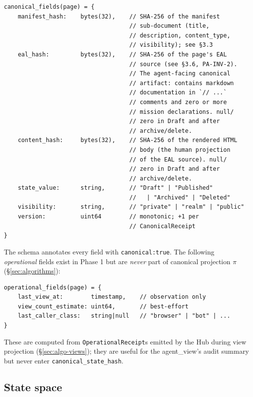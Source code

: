 \documentclass[11pt,a4paper]{article}
\theoremstyle{definition}
\begin{document}
\begin{lstlisting}
canonical_fields(page) = {
    manifest_hash:    bytes(32),    // SHA-256 of the manifest
                                    // sub-document (title,
                                    // description, content_type,
                                    // visibility); see §3.3
    eal_hash:         bytes(32),    // SHA-256 of the page's EAL
                                    // source (see §3.6, PA-INV-2).
                                    // The agent-facing canonical
                                    // artifact: contains markdown
                                    // documentation in `// ...`
                                    // comments and zero or more
                                    // mission declarations. null/
                                    // zero in Draft and after
                                    // archive/delete.
    content_hash:     bytes(32),    // SHA-256 of the rendered HTML
                                    // body (the human projection
                                    // of the EAL source). null/
                                    // zero in Draft and after
                                    // archive/delete.
    state_value:      string,       // "Draft" | "Published"
                                    //   | "Archived" | "Deleted"
    visibility:       string,       // "private" | "realm" | "public"
    version:          uint64        // monotonic; +1 per
                                    // CanonicalReceipt
}
\end{lstlisting}

The schema annotates every field with \texttt{canonical:true}. The
following \emph{operational} fields exist in Phase 1 but are
\emph{never} part of canonical projection $\pi$
(\S\ref{sec:algorithms}):

\begin{lstlisting}
operational_fields(page) = {
    last_view_at:        timestamp,    // observation only
    view_count_estimate: uint64,       // best-effort
    last_caller_class:   string|null   // "browser" | "bot" | ...
}
\end{lstlisting}

These are computed from \texttt{OperationalReceipt}s emitted by
the Hub during view projection (\S\ref{sec:algo-views}); they are
useful for the agent\_view's audit summary but never enter
\texttt{canonical\_state\_hash}.

\subsection{State space}
\label{sec:state-space}
\end{document}
